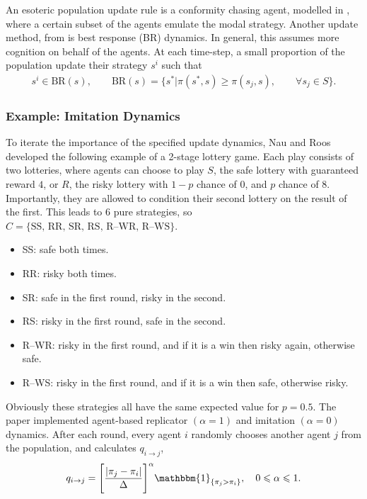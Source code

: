 An esoteric population update rule is a conformity chasing agent, modelled in \cite{RN23}, where a certain subset of the agents emulate the modal strategy. Another update method, from \cite{RN81} is best response (BR) dynamics. In general, this assumes more cognition on behalf of the agents. At each time-step, a small proportion of the population update their strategy $s^i$ such that 
\begin{align*}
    s^i \in \textrm{BR}(s), \qquad \textrm{BR}(s) = \{s^*| \pi(s^*,s) \geq \pi(s_j,s), \qquad \forall s_j \in S\}.
\end{align*}

\subsubsection{Example: Imitation Dynamics} \label{Lottery}
To iterate the importance of the specified update dynamics, Nau and Roos \cite{RN30} developed the following example of a 2-stage lottery game. Each play consists of two lotteries, where agents can choose to play $S$, the safe lottery with guaranteed reward $4$, or $R$, the risky lottery with $1-p$ chance of $0$, and $p$ chance of $8$. Importantly, they are allowed to condition their second lottery on the result of the first. This leads to 6 pure strategies, so $C = \{\textrm{SS, RR, SR, RS, R--WR, R--WS} \}$. 
\begin{itemize}
    \item SS: safe both times. 
    \item RR: risky both times. 
    \item SR: safe in the first round, risky in the second. 
    \item RS: risky in the first round, safe in the second.
    \item R--WR: risky in the first round, and if it is a win then risky again, otherwise safe.
    \item R--WS: risky in the first round, and if it is a win then safe, otherwise risky.
\end{itemize}
Obviously these strategies all have the same expected value for $p=0.5$. The paper implemented agent-based replicator $(\alpha = 1)$ and imitation $(\alpha = 0)$ dynamics. After each round, every agent $i$ randomly chooses another agent $j$ from the population, and calculates $q_{i\to j}$, \\

\begin{equation} \label{rep}
q_{i\to j} = \Bigg[ \frac{|\pi_j - \pi_i|}{\Delta} \Bigg]^\alpha \mathbbm{1}_{\{\pi_j>\pi_i\}}, \quad  0 \leq \alpha \leq 1.\end{equation} 

